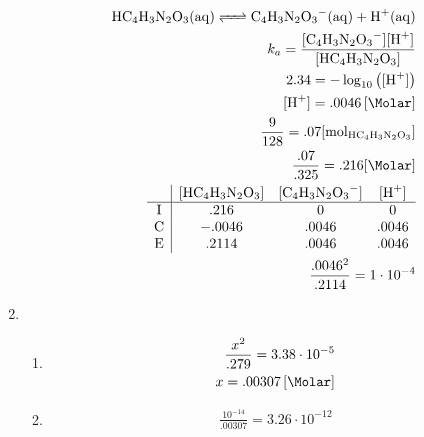 \documentclass[12pt]{article}
\begin{document}
\begin{enumerate}
    \begin{equation}
      \begin{split}
        \ce{HC4H3N2O3(aq) <=> C4H3N2O3-(aq) + H+(aq)}\\
        k_a=\frac{[\ce{C4H3N2O3-}][\ce{H+}]}{[\ce{HC4H3N2O3}]}\\
        2.34=-\log_{10}\left( [\ce{H+}] \right)\\
        [\ce{H+}]=.0046\left[ \si{\Molar} \right]\\
        \frac{9}{128}=.07[\si{\mole}_{\ce{HC4H3N2O3}}]\\
        \frac{.07}{.325}=.216[\si{\Molar}]\\
      \begin{array}{c | c c c} & [\ce{HC4H3N2O3}] & [\ce{C4H3N2O3-}] & [\ce{H+}]\\ \hline  \text{I} & .216 & 0 & 0\\ \text{C} & -.0046 & .0046 & .0046\\ \text{E} & .2114 & .0046 & .0046  \end{array}\\
      \frac{.0046^2}{.2114}=1\cdot10^{-4}
      \end{split}
      \label{4}
    \end{equation}

    \setcounter{enumi}{53}

  \item

    \begin{enumerate}

      \item 

    \begin{equation}
      \begin{split}
        \frac{x^2}{.279}=3.38\cdot10^{-5}\\
        x=.00307\left[ \si{\Molar} \right]\\
      \end{split}
      \label{5}
    \end{equation}

      \item

    \begin{equation}
      \begin{split}
        \frac{10^{-14}}{.00307}=3.26\cdot10^{-12}\\
      \end{split}
      \label{6}
    \end{equation}


\end{enumerate}
\end{enumerate}
\end{document}
